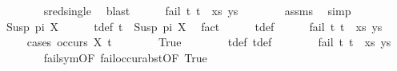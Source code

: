 \begin{isabellebody}
\ \ \ \ \ \ \isamarkupfalse%
\ sred{\isacharunderscore}{\kern0pt}single\ \isamarkupfalse%
\ blast\isanewline
\ \ \ \ \isamarkupfalse%
\ {\isachardoublequoteopen}fail\ {\isacharparenleft}{\kern0pt}{\isacharparenleft}{\kern0pt}t{}{\isacharcomma}{\kern0pt}\ t{}{\isacharparenright}{\kern0pt}\ {\isacharhash}{\kern0pt}\ xs{\isacharcomma}{\kern0pt}\ ys{\isacharparenright}{\kern0pt}{\isachardoublequoteclose}\isanewline
\ \ \ \ \ \ \isamarkupfalse%
\ assms\ \isamarkupfalse%
\ simp\isanewline
\ \ \isamarkupfalse%
\isanewline
\ \ \ \ \isamarkupfalse%
\ {\isacharparenleft}{\kern0pt}Susp\ pi\ X{\isacharparenright}{\kern0pt}\isanewline
\ \ \ \ \isamarkupfalse%
\ t{}{\isacharunderscore}{\kern0pt}def{\isacharcolon}{\kern0pt}\ {\isachardoublequoteopen}t{}\ {\isacharequal}{\kern0pt}\ Susp\ pi\ X{\isachardoublequoteclose}\ \isamarkupfalse%
\ fact\isanewline
\ \ \ \ \isamarkupfalse%
\ t{}{\isacharunderscore}{\kern0pt}def\isanewline
\ \ \ \ \isamarkupfalse%
\ {\isachardoublequoteopen}fail\ {\isacharparenleft}{\kern0pt}{\isacharparenleft}{\kern0pt}t{}{\isacharcomma}{\kern0pt}\ t{}{\isacharparenright}{\kern0pt}\ {\isacharhash}{\kern0pt}\ xs{\isacharcomma}{\kern0pt}\ ys{\isacharparenright}{\kern0pt}{\isachardoublequoteclose}\ \isanewline
\ \ \ \ \isamarkupfalse%
{\isacharparenleft}{\kern0pt}cases\ {\isachardoublequoteopen}occurs\ X\ t{}{\isacharprime}{\kern0pt}{\isachardoublequoteclose}{\isacharparenright}{\kern0pt}\isanewline
\ \ \ \ \ \ \isamarkupfalse%
\ True\isanewline
\ \ \ \ \ \ \isamarkupfalse%
\ t{}{\isacharunderscore}{\kern0pt}def\ t{}{\isacharunderscore}{\kern0pt}def\isanewline
\ \ \ \ \ \ \isamarkupfalse%
\ {\isachardoublequoteopen}fail\ {\isacharparenleft}{\kern0pt}{\isacharparenleft}{\kern0pt}t{}{\isacharcomma}{\kern0pt}\ t{}{\isacharparenright}{\kern0pt}\ {\isacharhash}{\kern0pt}\ xs{\isacharcomma}{\kern0pt}\ ys{\isacharparenright}{\kern0pt}{\isachardoublequoteclose}\ \isanewline
\ \ \ \ \ \ \isamarkupfalse%
\ fail{\isacharunderscore}{\kern0pt}sym{\isacharbrackleft}{\kern0pt}OF\ fail{\isacharunderscore}{\kern0pt}occur{\isacharunderscore}{\kern0pt}abst{\isacharbrackleft}{\kern0pt}OF\ True{\isacharbrackright}{\kern0pt}{\isacharbrackright}{\kern0pt}\ \isamarkupfalse%

\end{isabellebody}
